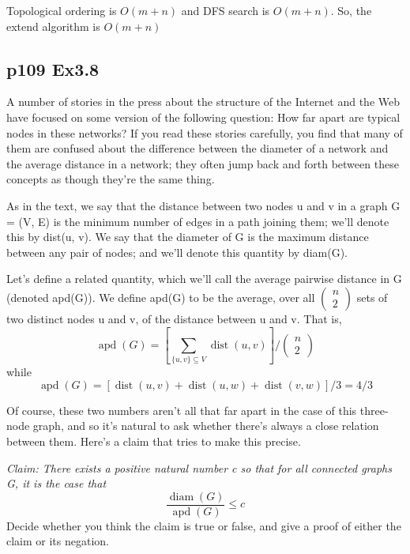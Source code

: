\documentclass[a4paper]{article}
\begin{document}
\par Topological ordering is $O(m+n)$ and DFS search is $O(m+n)$. So, the extend algorithm is $O(m+n)$

\vspace{2cm}



\subsection*{p109 Ex3.8}
\begin{adjustwidth}{1cm}{1cm}
	A number of stories in the press about the structure of the Internet and
	the Web have focused on some version of the following question: How
	far apart are typical nodes in these networks? If you read these stories
	carefully, you find that many of them are confused about the difference
	between the diameter of a network and the average distance in a network;
	they often jump back and forth between these concepts as though they’re
	the same thing.
	\par As in the text, we say that the distance between two nodes u and v
	in a graph G = (V, E) is the minimum number of edges in a path joining
	them; we’ll denote this by dist(u, v). We say that the diameter of G is
	the maximum distance between any pair of nodes; and we’ll denote this
	quantity by diam(G).
	\par Let’s define a related quantity, which we’ll call the average pairwise
	distance in G (denoted apd(G)). We define apd(G) to be the average, over
	all $\left(\begin{array}{l}n \\ 2\end{array}\right)$ sets of two distinct nodes u and v, of the distance between u and v.
	That is, \\
	$$\operatorname{apd}(G)=\left[\sum_{\{u, v\} \subseteq V} \operatorname{dist}(u, v)\right] /\left(\begin{array}{l}n\\2\end{array}\right)$$
	while
	$$\operatorname{apd}(G)=[\operatorname{dist}(u, v)+\operatorname{dist}(u, w)+\operatorname{dist}(v, w)] / 3=4 / 3$$
	\par Of course, these two numbers aren’t all that far apart in the case of
	this three-node graph, and so it’s natural to ask whether there’s always a
	close relation between them. Here’s a claim that tries to make this precise.\\
	\par \emph{Claim: There exists a positive natural number c so that for all connected graphs
		G, it is the case that}
	$$\frac{\operatorname{diam}(G)}{\operatorname{apd}(G)} \leq c$$
	Decide whether you think the claim is true or false, and give a proof of
	either the claim or its negation.
\end{adjustwidth}
\end{document}

